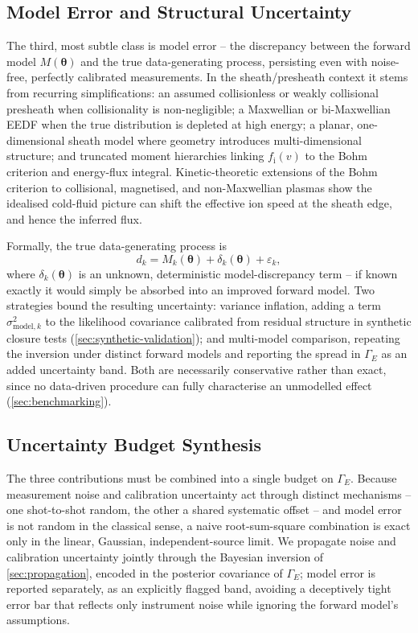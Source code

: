 \subsection{Model Error and Structural Uncertainty}
\label{subsec:model-error}

The third, most subtle class is model error -- the discrepancy between the forward model $M(\boldsymbol{\theta})$ and the true data-generating process, persisting even with noise-free, perfectly calibrated measurements. In the sheath/presheath context it stems from recurring simplifications: an assumed collisionless or weakly collisional presheath when collisionality is non-negligible; a Maxwellian or bi-Maxwellian EEDF when the true distribution is depleted at high energy; a planar, one-dimensional sheath model where geometry introduces multi-dimensional structure; and truncated moment hierarchies linking $f_{\mathrm{i}}(v)$ to the Bohm criterion and energy-flux integral. Kinetic-theoretic extensions of the Bohm criterion to collisional, magnetised, and non-Maxwellian plasmas show the idealised cold-fluid picture can shift the effective ion speed at the sheath edge, and hence the inferred flux.

Formally, the true data-generating process is
\begin{equation}
d_{k} = M_{k}(\boldsymbol{\theta}) + \delta_{k}(\boldsymbol{\theta}) + \varepsilon_{k},
\label{eq:model-discrepancy}
\end{equation}
where $\delta_{k}(\boldsymbol{\theta})$ is an unknown, deterministic model-discrepancy term -- if known exactly it would simply be absorbed into an improved forward model. Two strategies bound the resulting uncertainty: variance inflation, adding a term $\sigma_{\text{model},k}^{2}$ to the likelihood covariance calibrated from residual structure in synthetic closure tests (\cref{sec:synthetic-validation}); and multi-model comparison, repeating the inversion under distinct forward models and reporting the spread in $\Gamma_{E}$ as an added uncertainty band. Both are necessarily conservative rather than exact, since no data-driven procedure can fully characterise an unmodelled effect (\cref{sec:benchmarking}).

\subsection{Uncertainty Budget Synthesis}
\label{subsec:budget-synthesis}

The three contributions must be combined into a single budget on $\Gamma_{E}$. Because measurement noise and calibration uncertainty act through distinct mechanisms -- one shot-to-shot random, the other a shared systematic offset -- and model error is not random in the classical sense, a naive root-sum-square combination is exact only in the linear, Gaussian, independent-source limit. We propagate noise and calibration uncertainty jointly through the Bayesian inversion of \cref{sec:propagation}, encoded in the posterior covariance of $\Gamma_{E}$; model error is reported separately, as an explicitly flagged band, avoiding a deceptively tight error bar that reflects only instrument noise while ignoring the forward model's assumptions.

